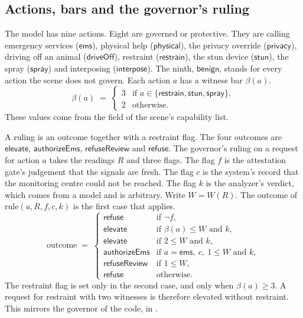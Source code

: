 \subsection{Actions, bars and the governor's ruling}

The model has nine actions.
Eight are governed or protective.
They are calling emergency services ($\mathsf{ems}$), physical help ($\mathsf{physical}$),
the privacy override ($\mathsf{privacy}$), driving off an animal ($\mathsf{driveOff}$),
restraint ($\mathsf{restrain}$), the stun device ($\mathsf{stun}$), the spray
($\mathsf{spray}$) and interposing ($\mathsf{interpose}$).
The ninth, $\mathsf{benign}$, stands for every action the scene does not govern.
Each action $a$ has a witness bar $\beta(a)$.
\begin{equation}
  \beta(a) \;=\;
  \begin{cases}
    3 & \text{if } a \in \{\mathsf{restrain}, \mathsf{stun}, \mathsf{spray}\},\\
    2 & \text{otherwise}.
  \end{cases}
\end{equation}
These values come from the  field of the scene's capability list.

A ruling is an outcome together with a restraint flag.
The four outcomes are $\mathsf{elevate}$, $\mathsf{authorizeEms}$, $\mathsf{refuseReview}$ and
$\mathsf{refuse}$.
The governor's ruling on a request for action $a$ takes the readings $R$ and three flags.
The flag $f$ is the attestation gate's judgement that the signals are fresh.
The flag $c$ is the system's record that the monitoring centre could not be reached.
The flag $k$ is the analyzer's verdict, which comes from a model and is arbitrary.
Write $W = W(R)$.
The outcome of $\mathrm{rule}(a, R, f, c, k)$ is the first case that applies.
\begin{equation}\label{eq:rule}
  \mathrm{outcome} \;=\;
  \begin{cases}
    \mathsf{refuse} & \text{if } \neg f,\\
    \mathsf{elevate} & \text{if } \beta(a) \le W \text{ and } k,\\
    \mathsf{elevate} & \text{if } 2 \le W \text{ and } k,\\
    \mathsf{authorizeEms} & \text{if } a = \mathsf{ems},\ c,\ 1 \le W \text{ and } k,\\
    \mathsf{refuseReview} & \text{if } 1 \le W,\\
    \mathsf{refuse} & \text{otherwise}.
  \end{cases}
\end{equation}
The restraint flag is set only in the second case, and only when $\beta(a) \ge 3$.
A request for restraint with two witnesses is therefore elevated without restraint.
This mirrors the governor of the code,  in .

